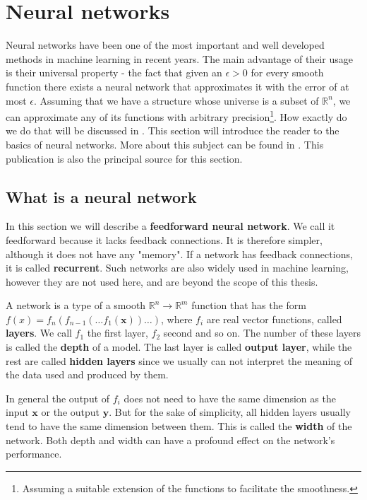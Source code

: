 \section{Neural networks}
Neural networks have been one of the most important and well developed methods in machine learning in recent years. The main advantage of their usage is their universal property - the fact that given an $\epsilon>0$ for every smooth function there exists  a neural network that approximates it with the error of at most $\epsilon$. Assuming that we have a structure whose universe is a subset of $\mathbb{R}^n$, we can approximate any of its functions with arbitrary precision\footnote{Assuming a suitable extension of the functions to facilitate the smoothness.}. How exactly do we do that will be discussed in . This section will introduce the reader to the basics of neural networks. More about this subject can be found in \cite{neural}. This publication is also the principal source for this section.

\subsection{What is a neural network}
\label{section:nn}
In this section we will describe a \textbf{feedforward neural network}. We call it feedforward because it lacks feedback connections. It is therefore simpler, although it does not have any "memory". If a network has feedback connections, it is called \textbf{recurrent}. Such networks are also widely used in machine learning, however they are not used here, and are beyond the scope of this thesis.

A network is a type of a smooth $\mathbb{R}^n\rightarrow\mathbb{R}^m$ function that has the form $f(x)=f_n(f_{n-1}(\dots f_1(\textbf{x}))\dots)$, where $f_i$ are real vector functions, called \textbf{layers}. We call $f_1$ the first layer, $f_2$ second and so on. The number of these layers is called the \textbf{depth} of a model. The last layer is called \textbf{output layer}, while the rest are called \textbf{hidden layers} since we usually can not interpret the meaning of the data used and produced by them.

In general the output of $f_i$ does not need to have the same dimension as the input $\textbf{x}$ or the output $\textbf{y}$. But for the sake of simplicity, all hidden layers usually tend to have the same dimension between them. This is called the \textbf{width} of the network. Both depth and width can have a profound effect on the network's performance. 

